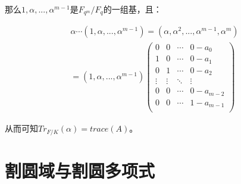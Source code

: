 \documentclass[12pt, a4paper, oneside]{ctexart}
\theoremstyle{definition}
\begin{document}
那么$1,\alpha,...,\alpha^{m-1}$是$F_{q^m}/F_q$的一组基，且：

\begin{align*}
\alpha\cdots(1,\alpha,...,\alpha^{m-1})=(\alpha,\alpha^2,...,\alpha^{m-1},\alpha^m)\\
=(1,\alpha,...,\alpha^{m-1})\begin{pmatrix}
0&0&\cdots&0-a_0\\
1&0&\cdots&0-a_1\\
0&1&\cdots&0-a_2\\
\vdots&\vdots&\ddots&\vdots\\
0&0&\cdots&0-a_{m-2}\\
0&0&\cdots&1-a_{m-1}\\
\end{pmatrix}
\end{align*}

从而可知$Tr_{F/K}(\alpha)=trace(A)$。

\section*{割圆域与割圆多项式}
\end{document}
